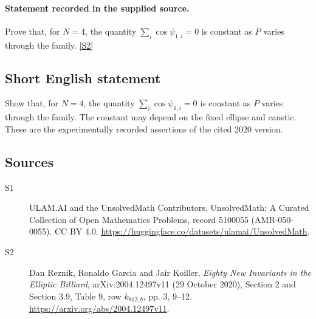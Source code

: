 \documentclass[11pt]{article}
\newcommand{\sref}[2]{\hyperlink{source:#1:#2}{[S#2]}}
\begin{document}
\paragraph{Statement recorded in the supplied source.}
Prove that, for $N=4$, the quantity $\sum_i\cos\psi_{1,i}=0$ is constant as $P$ varies through the family. \sref{5100055}{2}
\subsection{Short English statement}
Show that, for $N=4$, the quantity $\sum_i\cos\psi_{1,i}=0$ is constant as $P$ varies through the family. The constant may depend on the fixed ellipse and caustic. These are the experimentally recorded assertions of the cited 2020 version.
\subsection{Sources}
\begin{description}
\item[\hypertarget{source:5100055:1}{S1}] ULAM.AI and the UnsolvedMath Contributors, UnsolvedMath: A Curated Collection of Open Mathematics Problems, record 5100055 (AMR-050-0055). CC BY 4.0. \url{https://huggingface.co/datasets/ulamai/UnsolvedMath}.
\item[\hypertarget{source:5100055:2}{S2}] Dan Reznik, Ronaldo Garcia and Jair Koiller, \emph{Eighty New Invariants in the Elliptic Billiard}, arXiv:2004.12497v11 (29 October 2020), Section 2 and Section 3.9, Table 9, row $k_{812,b}$, pp. 3, 9--12. \url{https://arxiv.org/abs/2004.12497v11}.
\end{description}
\label{end:5100055}
\end{document}
